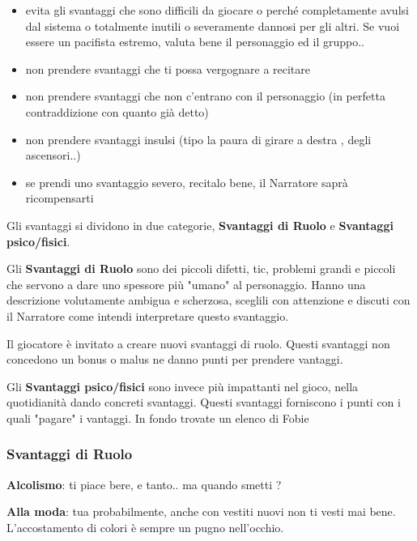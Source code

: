 \documentclass[a4paper,11pt,twoside,openany]{book}
\begin{document}
{\begin{itemize}
\item 
evita gli svantaggi che sono difficili da giocare o perché completamente avulsi dal sistema o totalmente inutili o severamente dannosi per gli altri. Se vuoi essere un pacifista estremo, valuta bene il personaggio ed il gruppo.. 
\item 
non prendere svantaggi che ti possa vergognare a recitare 
\item 
non prendere svantaggi che non c'entrano con il personaggio (in perfetta contraddizione con quanto già detto) 
\item 
non prendere svantaggi insulsi (tipo la paura di girare a destra , degli ascensori..) 
\item 
se prendi uno svantaggio severo, recitalo bene, il Narratore saprà ricompensarti 
\end{itemize}

Gli svantaggi si dividono in due categorie, \textbf{Svantaggi di Ruolo} e \textbf{Svantaggi psico/fisici}. 

Gli \textbf{Svantaggi di Ruolo} sono dei piccoli difetti, tic, problemi grandi e piccoli che servono a dare uno spessore più "umano" al personaggio. Hanno una descrizione volutamente ambigua e scherzosa, sceglili con attenzione e discuti con il Narratore come intendi interpretare questo svantaggio.

Il giocatore è invitato a creare nuovi svantaggi di ruolo. Questi svantaggi non concedono un bonus o malus ne danno punti per prendere vantaggi.

\bigskip

Gli \textbf{Svantaggi psico/fisici} sono invece più impattanti nel gioco, nella quotidianità dando concreti svantaggi. Questi svantaggi forniscono i punti con i quali "pagare" i vantaggi. In fondo trovate un elenco di Fobie

\pagebreak

\subsubsection{Svantaggi di Ruolo}

\bigskip

\textbf{Alcolismo}: ti piace bere, e tanto.. ma quando smetti ?

\textbf{Alla moda}: tua probabilmente, anche con vestiti nuovi non ti vesti mai bene. L'accostamento di colori è sempre un pugno nell'occhio.

}
\end{document}
